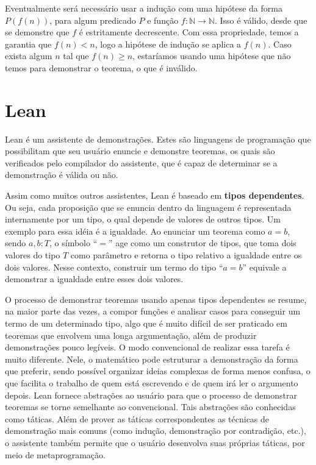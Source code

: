 \documentclass[12pt, oneside, a4paper,english,brazil]{abntex2}
\begin{document}
\qquad Eventualmente ser\'a necess\'ario usar a indu\c{c}\~ao com uma hip\'otese da forma $P(f(n))$, para
algum predicado $P$ e fun\c{c}\~ao $f : \mathbb{N} \rightarrow \mathbb{N}$. Isso \'e v\'alido, desde que se
demonstre que $f$ \'e estritamente decrescente. Com essa propriedade, temos a garantia que $f(n) < n$,
logo a hip\'otese de indu\c{c}\~ao se aplica a $f(n)$. Caso exista algum $n$ tal que $f(n) \geq n$,
estar\'iamos usando uma hip\'otese que n\~ao temos para demonstrar o teorema, o que \'e inv\'alido.

\section{Lean}

\qquad Lean\cite{2} \'e um assistente de demonstra\c{c}\~oes. Estes s\~ao linguagens de programa\c{c}\~ao que
possibilitam que seu usu\'ario enuncie e demonstre teoremas, os quais s\~ao verificados pelo compilador do
assistente, que \'e capaz de determinar se a demonstra\c{c}\~ao \'e v\'alida ou n\~ao.

\qquad Assim como muitos outros assistentes, Lean \'e baseado em \textbf{tipos
  dependentes}\cite{typesAtWork}. Ou seja, cada proposi\c{c}\~ao que se enuncia dentro da linguagem \'e
representada internamente por um tipo, o qual depende de valores de outros tipos. Um exemplo para essa
id\'eia \'e a igualdade. Ao enunciar um teorema como $a = b$, sendo $a, b : T$, o s\'imbolo ``$=$'' age como
um construtor de tipos, que toma dois valores do tipo $T$ como par\^ametro e retorna o tipo relativo a
igualdade entre os dois valores. Nesse contexto, construir um termo do tipo ``$a = b$'' equivale a demonstrar
a igualdade entre esses dois valores.

\qquad O processo de demonstrar teoremas usando apenas tipos dependentes se resume, na maior parte das vezes, a compor fun\c{c}\~oes e analisar casos para conseguir um termo de um determinado tipo, algo que \'e muito dif\'icil de ser praticado em teoremas que envolvem uma longa argumenta\c{c}\~ao, al\'em de produzir demonstra\c{c}\~oes pouco leg\'iveis. O modo convencional de realizar essa tarefa \'e muito diferente. Nele,
o matem\'atico pode estruturar a demonstra\c{c}\~ao da forma que preferir, sendo poss\'ivel organizar
ideias complexas de forma menos confusa, o que facilita o trabalho de quem est\'a escrevendo e de quem ir\'a
ler o argumento depois.
Lean fornece abstra\c{c}\~oes ao usu\'ario para que o processo de demonstrar teoremas se torne semelhante ao
convencional. Tais abstra\c{c}\~oes s\~ao conhecidas como t\'aticas. Al\'em de prover as t\'aticas
correspondentes as t\'ecnicas de demonstra\c{c}\~ao mais comuns (como indu\c{c}\~ao, demonstra\c{c}\~ao por contradi\c{c}\~ao, etc.), o assistente tamb\'em permite que o usu\'ario desenvolva suas pr\'oprias t\'aticas, por meio de metaprograma\c{c}\~ao\cite{metaprog}.
\end{document}
